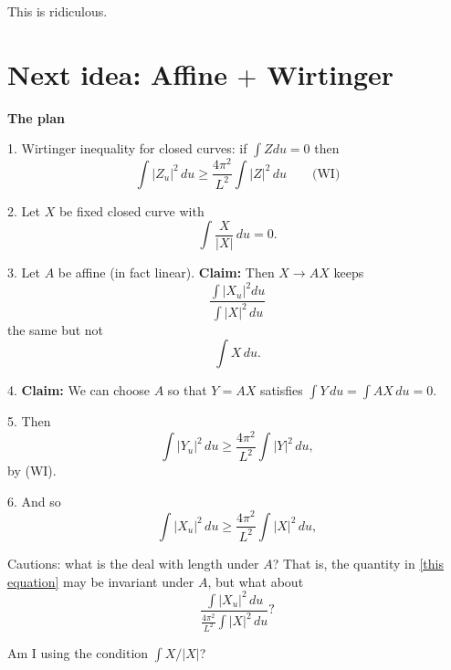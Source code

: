 \documentclass{amsart}
\begin{document}
This is ridiculous.

\clearpage

\section*{Next idea:  Affine $+$ Wirtinger}

\textbf{The plan}
 
 1.  Wirtinger inequality for closed curves:  if $\int Z du =0$ then 
 $$\int |Z_u|^2 \,du \ge \frac{4\pi^2}{L^2}\int |Z|^2 \,du  \quad \quad \text{(WI)}$$
 
 2.  Let $X$ be fixed closed curve with $$\int \frac{X}{|X|}\,du =0.$$
 
 3.  Let $A$ be affine (in fact linear).  \textbf{Claim: }Then $X\rightarrow AX$ keeps 
 \begin{equation}\frac{\int |X_u|^2 du }{\int |X|^2 \,du}  \label{this equation} \end{equation}
 the same but not $$\int X\,du.$$
 
 4.   \textbf{Claim:} We can choose $A$ so that $Y=AX$ satisfies $\int Y \,du =\int AX\,du=0.$
 
 5.  Then $$\int |Y_u|^2 \,du \ge \frac{4\pi^2}{L^2}\int {|Y|^2}\,du,$$ by (WI).
 
 6.  And so $$\int |X_u|^2 \,du \ge \frac{4\pi^2}{L^2}\int {|X|^2}\,du,$$


Cautions:  what is the deal with length under $A$? That is, the quantity in \eqref{this equation} may be invariant under $A$, but what about
\begin{equation}\frac{ \int |{X}_u|^2 \,du}{ \frac{4\pi^2}{L^2}\int |{X}|^2\,du } ? \end{equation}

Am I using the condition $\int X/|X|$?
\end{document}
